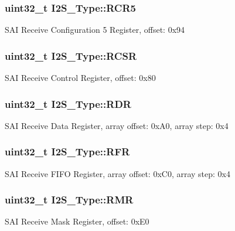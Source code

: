 \subsubsection[{\texorpdfstring{R\+C\+R5}{RCR5}}]{ uint32\+\_\+t I2\+S\+\_\+\+Type\+::\+R\+C\+R5}\hypertarget{structI2S__Type_affd777b7e9dafd3fd7185f034aab4b50}{}\label{structI2S__Type_affd777b7e9dafd3fd7185f034aab4b50}
S\+AI Receive Configuration 5 Register, offset\+: 0x94 
\subsubsection[{\texorpdfstring{R\+C\+SR}{RCSR}}]{ uint32\+\_\+t I2\+S\+\_\+\+Type\+::\+R\+C\+SR}\hypertarget{structI2S__Type_a3e9f96292f8fdc9b1b74b67e4f9f2b96}{}\label{structI2S__Type_a3e9f96292f8fdc9b1b74b67e4f9f2b96}
S\+AI Receive Control Register, offset\+: 0x80 
\subsubsection[{\texorpdfstring{R\+DR}{RDR}}]{ uint32\+\_\+t I2\+S\+\_\+\+Type\+::\+R\+DR}\hypertarget{structI2S__Type_a503fa18206adf56c5afae6cf77acc397}{}\label{structI2S__Type_a503fa18206adf56c5afae6cf77acc397}
S\+AI Receive Data Register, array offset\+: 0x\+A0, array step\+: 0x4 
\subsubsection[{\texorpdfstring{R\+FR}{RFR}}]{ uint32\+\_\+t I2\+S\+\_\+\+Type\+::\+R\+FR}\hypertarget{structI2S__Type_a16852a97d90329db35b5ff8663c9488c}{}\label{structI2S__Type_a16852a97d90329db35b5ff8663c9488c}
S\+AI Receive F\+I\+FO Register, array offset\+: 0x\+C0, array step\+: 0x4 
\subsubsection[{\texorpdfstring{R\+MR}{RMR}}]{ uint32\+\_\+t I2\+S\+\_\+\+Type\+::\+R\+MR}\hypertarget{structI2S__Type_ab2b55d0a250082bacc98cb3845769560}{}\label{structI2S__Type_ab2b55d0a250082bacc98cb3845769560}
S\+AI Receive Mask Register, offset\+: 0x\+E0 
